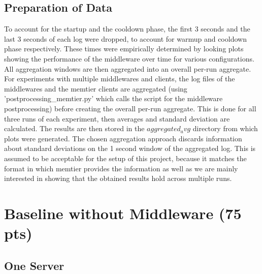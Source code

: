 \documentclass[11pt,a4paper]{article}
\begin{document}
\subsection{Preparation of Data}
To account for the startup and the cooldown phase, the first 3 seconds and the last 3 seconds of each log were dropped, to account for warmup and cooldown phase respectively.
These times were empirically determined by looking plots showing the performance of the middleware over time for various configurations.
All aggregation windows are then aggregated into an overall per-run aggregate.
For experiments with multiple middlewares and clients, the log files of the middlewares and the memtier clients are aggregated (using 'postprocessing\_memtier.py' which calls the script for the middleware postprocessing) before creating the overall per-run aggregate.
This is done for all three runs of each experiment, then averages and standard deviation are calculated.
The results are then stored in the $aggregated_avg$ directory from which plots were generated.
The chosen aggregation approach discards information about standard deviations on the 1 second window of the aggregated log.
This is assumed to be acceptable for the setup of this project, because it matches the format in which memtier provides the information as well as we are mainly interested in showing that the obtained results hold across multiple runs.





\section{Baseline without Middleware (75 pts)} \label{section2}

\subsection{One Server} \label{sec2.1}
\end{document}
